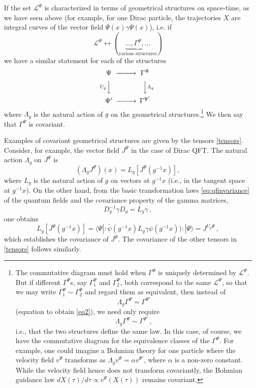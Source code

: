 \documentclass[12pt]{article}
\begin{document}
If the set  $\mathscr{L}^\Psi$ is characterized in terms of
geometrical structures on space-time, as we have seen above (for
example, for one Dirac particle, the trajectories $X$ are integral
curves of the vector field $  \overline{\Psi} ( x) \gamma  \Psi (
x)$), i.e. if  
\begin{equation}
\mathscr{L}^\Psi \longleftrightarrow (  \underbrace{\ldots,
  \Gamma^\Psi, \ldots}_{\text{various structures}}  ) 
\end{equation}
we have a similar statement for each of the structures
\begin{equation}
 \CD
\Psi{}    @>>>    {\Gamma}^\Psi{}\\
@VU_gVV         @VV \Lambda_g V\\
\Psi{}'  @>>>    {\Gamma}^{\Psi{}'}
\endCD\label{eq2}
\end{equation}
where $\Lambda_g $ is the natural action of $g$ on the
geometrical structures.\footnote{ The commutative diagram must hold when
    ${\Gamma}^\Psi{}$ is uniquely determined by
    $\mathscr{L}^\Psi$. But if different 
${\Gamma}^\Psi{}$s, say ${\Gamma}^\Psi_1$  and ${\Gamma}^\Psi_2$, both
correspond to the same  $\mathscr{L}^\Psi$, so that we may write
${\Gamma}^\Psi_1 \sim {\Gamma}^\Psi_2$ and regard them as equivalent,
then instead of $$\Lambda_g {\Gamma}^\Psi =  {\Gamma}^{\Psi'}$$
(equation to obtain \eqref{eq2}), we need only require
$$\Lambda_g {\Gamma}^\Psi \sim  {\Gamma}^{\Psi'}\,,$$ 
i.e., that the two structures define the same law. In this case, of
course, we have the commutative diagram for the equivalence classes of
the $ {\Gamma}^\Psi$.  For example, one could imagine a Bohmian theory for one particle where the velocity field $v^\Psi$ transforms as $\Lambda_g v^\Psi = \alpha v^{\Psi'}$, where $\alpha$ is a non-zero constant. While the velocity field hence does not transform covariantly, the Bohmian guidance law $dX(\tau)/d\tau \propto v^\Psi (X(\tau))$ remains covariant.} We then say that ${\Gamma}^\Psi$ is covariant. 

Examples of covariant geometrical structures are given by the tensors \eqref{tensors}. Consider, for example, the vector field $J^\Psi$ in the case of Dirac QFT. The natural action $\Lambda_g$ on $J^\Psi$ is 
\begin{equation} 
(\Lambda_g J^\Psi) (x) = L_g \left[ J^\Psi (g^{-1} x) \right],
\end{equation}
where $L_g$ is the natural action of $g$ on vectors at $g^{-1} x$ (i.e., in the tangent space at $g^{-1} x$). On the other hand, from the basic transformation laws 
\eqref{eq:qfinvariance} of the  quantum fields and the covariance property of the gamma matrices,
\begin{equation}D^{-1}_g \gamma D_g = L_g \gamma\,, \end{equation}
one obtains
$$  L_g \left[ J^\Psi (g^{-1} x) \right]=   \langle \Psi{} | : \bar{\psi{}} (g^{-1} x) L_g \gamma 
  \psi{} (g^{-1} x)): | \Psi{} \rangle 
=  J^{U_g\Psi}\,,$$
which establishes the covariance of $J^\Psi$. The covariance of the other tensors in \eqref{tensors} follows similarly. 
\end{document}
